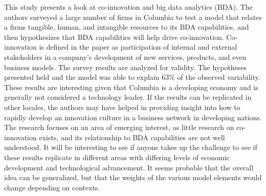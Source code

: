 \renewcommand{\mykey}{lozadaBigDataAnalytics2019}
\fakesection{\citeauthor{\mykey} \citeyear{\mykey} }
\fullcitebib{\mykey}


This study presents a look at co-innovation and big data analytics (BDA). The authors surveyed a large number of firms in Columbia to test a model that relates a firms tangible, human, and intangible resources to its BDA capabilities, and then hypothesizes that BDA capabilities will help drive co-innovation. Co-innovation is defined in the paper as participation of internal and external stakeholders in a company's development of new services, products, and even business models. The survey results are analyzed for validity. The hypotheses presented held and the model was able to explain 63\% of the observed variability. These results are interesting given that Columbia is a developing economy and is generally not considered a technology leader. If the results can be replicated in other locales, the authors may have helped in providing insight into how to rapidly develop an innovation culture in a business network in developing nations. The research focuses on an area of emerging interest, as little research on co-innovation exists, and its relationship to BDA capabilities are not well understood. It will be interesting to see if anyone takes up the challenge to see if these results replicate in different areas with differing levels of economic development and technological advancement. It seems probable that the overall idea can be generalized, but that the weights of the various model elements would change depending on contexts.

\newpage
